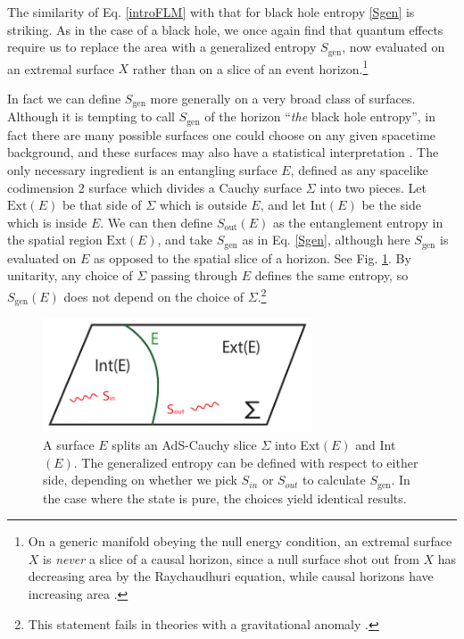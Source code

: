 \documentclass[12pt]{article}
\theoremstyle{remark}
\numberwithin{equation}{section}
\numberwithin{equation}{section}
\begin{document}
The similarity of Eq. \ref{introFLM} with that for black hole entropy \ref{Sgen} is striking.  As in the case of a black hole, we once again find that quantum effects require us to replace the area with a generalized entropy $S_\mathrm{gen}$, now evaluated on an extremal surface $X$ rather than on a slice of an event horizon.\footnote{On a generic manifold obeying the null energy condition, an extremal surface $X$ is \emph{never} a slice of a causal horizon, since a null surface shot out from $X$ has decreasing area by the Raychaudhuri equation, while causal horizons have increasing area \cite{HawkingEllis}.}

In fact we can define $S_\mathrm{gen}$ more generally on a very broad class of surfaces.  Although it is tempting to call $S_\mathrm{gen}$ of the horizon ``\emph{the} black hole entropy'', in fact there are many possible surfaces one could choose on any given spacetime background, and these surfaces may also have a statistical interpretation \cite{Sorkin83, Jacobson95, BianchiMyers12, Balasubramanian:2013lsa, Myers:2014jia, Czech:2014wka}.  The only necessary ingredient is an entangling surface $E$, defined as any spacelike codimension 2 surface which divides a Cauchy surface $\Sigma$ into two pieces.  Let $\mathrm{Ext}(E)$ be that side of $\Sigma$ which is outside $E$, and let $\mathrm{Int}(E)$ be the side which is inside $E$.  We can then define $S_\mathrm{out}(E)$ as the entanglement entropy in the spatial region $\mathrm{Ext}(E)$, and take $S_{\text{gen}}$ as in Eq. \ref{Sgen}, although here $S_{\text{gen}}$ is evaluated on $E$ as opposed to the spatial slice of a horizon.  See Fig. \ref{EntanglingSurface}. By unitarity, any choice of $\Sigma$ passing through $E$ defines the same entropy, so $S_\mathrm{gen}(E)$ does not depend on the choice of $\Sigma$.\footnote{This statement fails in theories with a gravitational anomaly \cite{Wall:2011kb, WallIqbal}.}  

\begin{figure}[t]
\begin{center}
\includegraphics[width=8cm]{EntanglingSurface.pdf} 
\caption{A surface $E$ splits an AdS-Cauchy slice $\Sigma$ into Ext$(E)$ and Int$(E)$. The generalized entropy can be defined with respect to either side, depending on whether we pick $S_{in}$ or $S_{out}$ to calculate $S_{\text{gen}}$. In the case where the state is pure, the choices yield identical results.
}
\label{EntanglingSurface}
\end{center}
\end{figure}
\end{document}
